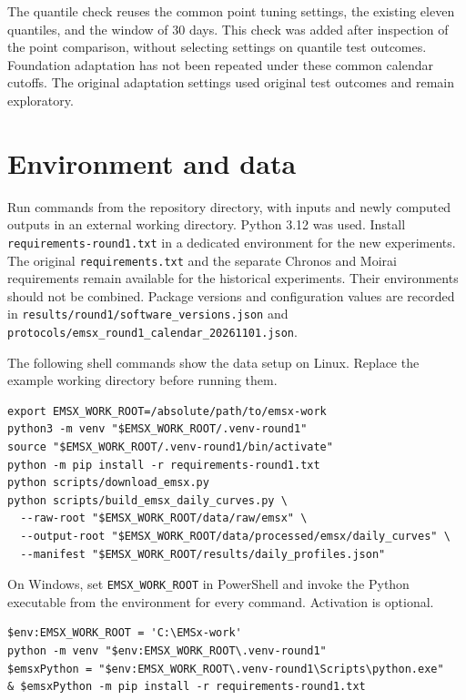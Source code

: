 The quantile check reuses the common point tuning settings, the existing eleven
quantiles, and the window of 30 days. This check was added after inspection of
the point comparison, without selecting settings on quantile test outcomes.
Foundation adaptation has not been repeated under these common calendar cutoffs.
The original adaptation settings used original test outcomes and remain exploratory.

\section*{Environment and data}

Run commands from the repository directory, with inputs and newly computed
outputs in an external working directory. Python 3.12 was used. Install
\texttt{requirements-round1.txt} in a dedicated environment for the new experiments.
The original \texttt{requirements.txt} and the separate Chronos and Moirai
requirements remain available for the historical experiments. Their environments
should not be combined. Package versions and configuration values are recorded
in \texttt{results/round1/software\_versions.json} and
\texttt{protocols/emsx\_round1\_calendar\_20261101.json}.

The following shell commands show the data setup on Linux. Replace the example
working directory before running them.

\begin{verbatim}
export EMSX_WORK_ROOT=/absolute/path/to/emsx-work
python3 -m venv "$EMSX_WORK_ROOT/.venv-round1"
source "$EMSX_WORK_ROOT/.venv-round1/bin/activate"
python -m pip install -r requirements-round1.txt
python scripts/download_emsx.py
python scripts/build_emsx_daily_curves.py \
  --raw-root "$EMSX_WORK_ROOT/data/raw/emsx" \
  --output-root "$EMSX_WORK_ROOT/data/processed/emsx/daily_curves" \
  --manifest "$EMSX_WORK_ROOT/results/daily_profiles.json"
\end{verbatim}

On Windows, set \texttt{EMSX\_WORK\_ROOT} in PowerShell and invoke the Python
executable from the environment for every command. Activation is optional.

\begin{verbatim}
$env:EMSX_WORK_ROOT = 'C:\EMSx-work'
python -m venv "$env:EMSX_WORK_ROOT\.venv-round1"
$emsxPython = "$env:EMSX_WORK_ROOT\.venv-round1\Scripts\python.exe"
& $emsxPython -m pip install -r requirements-round1.txt
\end{verbatim}

